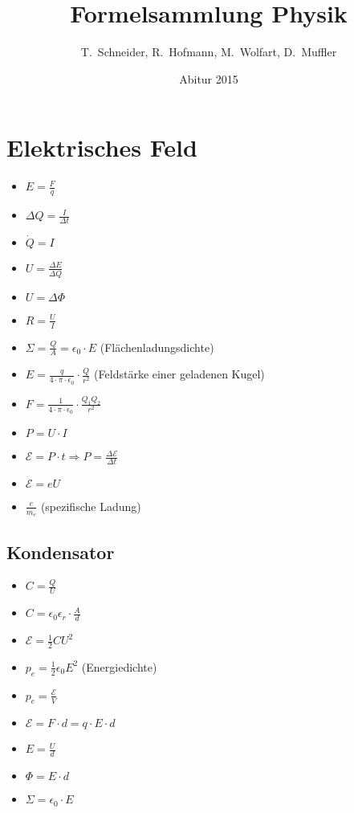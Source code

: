 \documentclass[paper = a4, twocolumn]{scrartcl}
\title{Formelsammlung Physik}
\author{T.~Schneider, R.~Hofmann, M.~Wolfart, D.~Muffler}
\date{Abitur 2015}
\DeclareRobustCommand{\E}{\mathcal{E}}
\begin{document}
\maketitle
\tableofcontents

\section{Elektrisches Feld}
\begin{itemize}
\item
	\( E = \frac{F}{q} \)
\item
	\( \Delta Q = \frac{I}{\Delta t} \)
\item
	\( \dot{Q} = I \)
\item
	\( U = \frac{\Delta E}{\Delta Q} \)
\item
	\( U = \Delta \Phi \)
\item
	\( R = \frac{U}{I} \)
\item
	\( \Sigma = \frac{Q}{A} = \epsilon_0 \cdot E \) (Flächenladungsdichte)
\item
	\( E = \frac{q}{4 \cdot \pi \cdot \epsilon_0} \cdot \frac{Q}{r^2} \)
	(Feldstärke einer geladenen Kugel)
\item
	\( F = \frac{1}{4 \cdot \pi \cdot \epsilon_0} \cdot \frac{Q_1 Q_2}{r^2} \)
\item
	\( P = U \cdot I \)
\item
	\( \E = P \cdot t \Rightarrow P = \frac{\Delta \E}{\Delta t} \)
\item
	\( \E = eU \)
\item
	\( \frac{e}{m_e} \) (spezifische Ladung)
\end{itemize}

\subsection{Kondensator}
\begin{itemize}
\item
	\( C = \frac{Q}{U} \)
\item
	\( C = \epsilon_0 \epsilon_r \cdot \frac{A}{d} \)
\item
	\( \E = \frac{1}{2} C U^2 \)
\item
	\( p_e = \frac{1}{2} \epsilon_0 E^2 \) (Energiedichte)
\item
	\( p_e = \frac{\E}{V} \)
\item
	\( \E = F \cdot d = q \cdot E \cdot d \)
\item
	\( E = \frac{U}{d} \)
\item
	\( \Phi = E \cdot d \)
\item
	\( \Sigma = \epsilon_0 \cdot E \)
\end{itemize}
\end{document}
